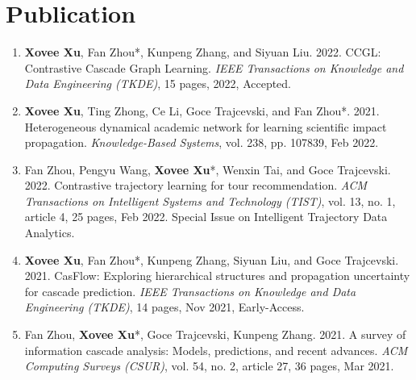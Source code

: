 \section*{Publication}
\indent



\begin{enumerate}[resume]
    \item \textbf{Xovee Xu}, Fan Zhou*, Kunpeng Zhang, and Siyuan Liu. 2022. CCGL: Contrastive Cascade Graph Learning. \textit{IEEE Transactions on Knowledge and Data Engineering (TKDE)}, 15 pages, 2022, Accepted.
    \item \textbf{Xovee Xu}, Ting Zhong, Ce Li, Goce Trajcevski, and Fan Zhou*. 2021. Heterogeneous dynamical academic network for learning scientific impact propagation. \textit{Knowledge-Based Systems}, vol. 238, pp. 107839, Feb 2022.
    \item Fan Zhou, Pengyu Wang, \textbf{Xovee Xu}*, Wenxin Tai, and Goce Trajcevski. 2022. Contrastive trajectory learning for tour recommendation. \textit{ACM Transactions on Intelligent Systems and Technology (TIST)}, vol. 13, no. 1, article 4, 25 pages, Feb 2022. Special Issue on Intelligent Trajectory Data Analytics.
    \item \textbf{Xovee Xu}, Fan Zhou*, Kunpeng Zhang, Siyuan Liu, and Goce Trajcevski. 2021. CasFlow: Exploring hierarchical structures and propagation uncertainty for cascade prediction. \textit{IEEE Transactions on Knowledge and Data Engineering (TKDE)}, 14 pages, Nov 2021, Early-Access.
    \item Fan Zhou, \textbf{Xovee Xu}*, Goce Trajcevski, Kunpeng Zhang. 2021. A survey of information cascade analysis: Models, predictions, and recent advances. \textit{ACM Computing Surveys (CSUR)}, vol. 54, no. 2, article 27, 36 pages, Mar 2021. 
\end{enumerate}


